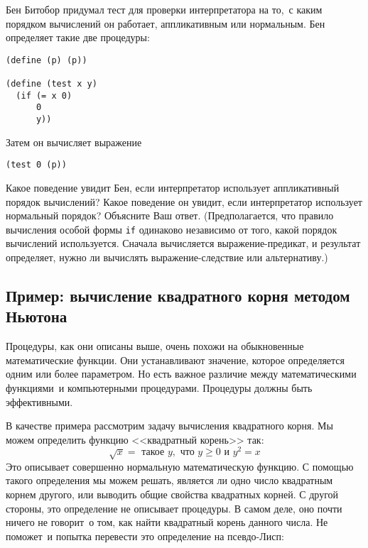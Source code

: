 \begin{exercise}{1.5}\label{EX1.5}%
Бен Битобор придумал тест для проверки интерпретатора на
то,~с каким порядком вычислений он работает,
аппликативным или
нормальным.  Бен определяет такие 
две процедуры: 

\begin{Verbatim}[fontsize=\small]
(define (p) (p))

(define (test x y)
  (if (= x 0)
      0
      y))
\end{Verbatim}
Затем он вычисляет выражение

\begin{Verbatim}[fontsize=\small]
(test 0 (p))
\end{Verbatim}
Какое поведение увидит Бен, если интерпретатор использует
аппликативный порядок вычислений?  Какое поведение он увидит, если
интерпретатор использует нормальный порядок? Объясните Ваш
ответ. (Предполагается, что правило вычисления особой формы
{\tt if}
одинаково независимо от того, какой порядок
вычислений используется.  Сначала вычисляется выражение-предикат, и
результат определяет, нужно ли вычислять выражение-следствие или
альтернативу.)
\end{exercise}

\subsection{Пример: вычисление квадратного корня методом Ньютона}
\label{EXAMPLE-SQUARE-ROOTS-BY-NEWTONS-METHOD}


%
Процедуры, как
они описаны выше, очень похожи на
обыкновенные математические функции.  Они устанавливают значение,
которое определяется одним или более параметром.  Но есть важное
различие между математическими функциями~и компьютерными процедурами.
Процедуры должны быть эффективными.

В качестве примера рассмотрим задачу вычисления квадратного 
корня.  Мы можем определить функцию <<квадратный корень>> так:
$$
\sqrt{x} = \mbox{ такое } y, \mbox{ что } y \ge 0 \mbox{~и } y^2 = x
$$
Это описывает совершенно нормальную математическую функцию. С помощью
такого определения мы можем решать, является ли одно
число квадратным корнем другого, или выводить общие свойства
квадратных корней. С другой стороны, это определение не описывает
процедуры. В самом деле, оно почти ничего не говорит~о том, как найти
квадратный корень данного числа.  Не поможет~и попытка перевести
это определение на псевдо-Лисп:

